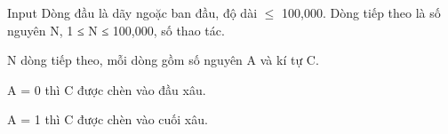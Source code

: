 Input
Dòng đầu là dãy ngoặc ban đầu, độ dài  $\le$  100,000. Dòng tiếp theo là số nguyên N, 1 ≤ N ≤ 100,000, số thao tác.





N dòng tiếp theo, mỗi dòng gồm số nguyên A và kí tự C.


A = 0 thì C được chèn vào đầu xâu.


A = 1 thì C được chèn vào cuối xâu.